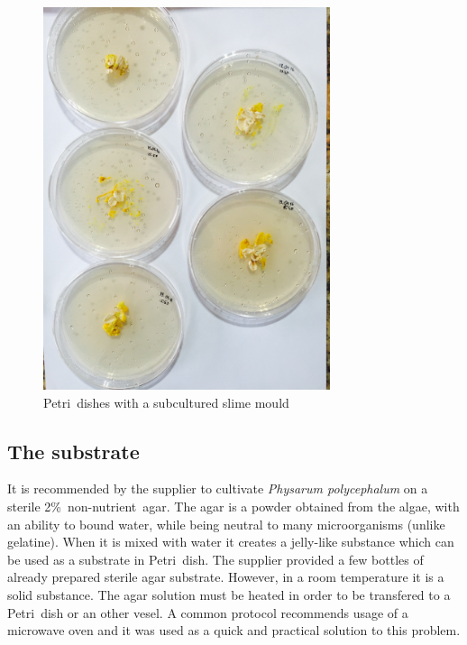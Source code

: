 \documentclass[english,a4paper,twoside]{ppfcmthesis}
\begin{document}
\begin{figure}
  \centering

  \includegraphics[width=0.75\textwidth]{figures/physarum/IMG_1175.jpg}

  \caption{Petri~dishes with a subcultured slime mould}
  \label{figure:p_multiple_petri}
\end{figure}


\subsection*{The substrate}

It is recommended by the supplier to cultivate \textit{Physarum polycephalum} on a sterile 2\%~non-nutrient~agar. The agar is a powder obtained from the algae, with an ability to bound water, while being neutral to many microorganisms (unlike gelatine). When it is mixed with water it creates a jelly-like substance which can be used as a substrate in Petri~dish. The supplier provided a few bottles of already prepared sterile agar substrate. However, in a room temperature it is a solid substance. The agar solution must be heated in order to be transfered to a Petri~dish or an other vesel. A common protocol recommends usage of a microwave oven \cite{hanson1978microwave} and it was used as a quick and practical solution to this problem. 
\end{document}
